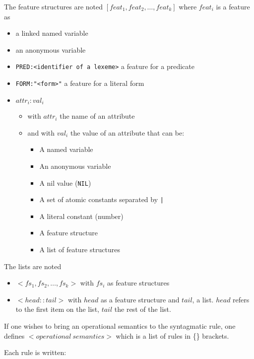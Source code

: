 \documentclass[11pt]{article}
\begin{document}
The feature structures are noted $[ feat_1, feat_2, \dots, feat_k ]$
where $ feat_i$ is a feature as
\begin{itemize}
\item a linked named variable
\item an anonymous variable
\item \verb#PRED:<identifier of a lexeme># a feature for a predicate
\item \verb#FORM:"<form>"# a feature for a literal form
\item $attr_i:val_i$
  \begin{itemize}
  \item with $attr_i$ the name of an attribute
  \item and with $val_i$ the value of an attribute that can be: 
    
    \begin{itemize}
    \item A named variable
    \item An anonymous variable
    \item A nil value (\texttt{NIL})
    \item A set of atomic constants separated by \verb#|#
    \item A literal constant (number)
    \item A feature structure
    \item A list of feature structures
    \end{itemize}
  \end{itemize}
  
\end{itemize}

The lists are noted
\begin{itemize}
\item $<fs_1, fs_2, \dots, fs_k>$ with $fs_i$ as feature structures
\item $<head::tail>$ with $head$ as a feature structure and $tail$, a
  list. $head$ refers to the first item on the list, $tail$ the rest
  of the list.
\end{itemize}

If one wishes to bring an operational semantics to the syntagmatic
rule, one defines $<operational~semantics>$ which is a list of rules
in \{\} brackets.

Each rule is written:
\end{document}
